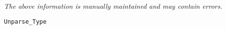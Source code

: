 \label{pkg:unparse\_type}

{\tiny \it The above information is manually maintained and may contain errors.}
\begin{verbatim}
Unparse_Type
\end{verbatim}

